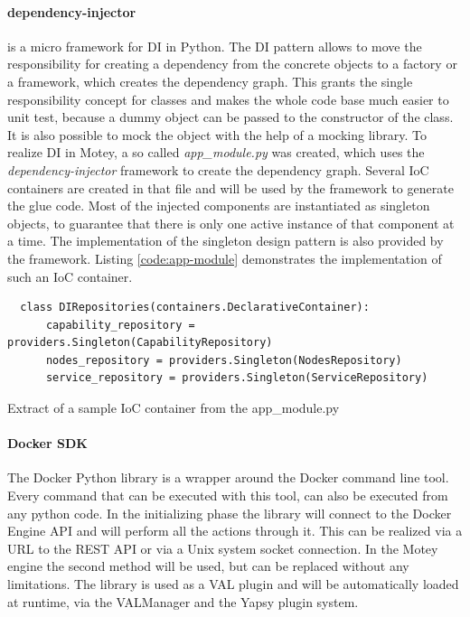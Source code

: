 \paragraph{dependency-injector} is a micro framework for \acf{DI} in Python.
The \ac{DI} pattern allows to move the responsibility for creating a dependency from the concrete objects to a factory or a framework, which creates the dependency graph.
This grants the single responsibility concept for classes and makes the whole code base much easier to unit test, because a dummy object can be passed to the constructor of the class.
It is also possible to mock the object with the help of a mocking library.
To realize \ac{DI} in Motey, a so called \textit{app\_module.py} was created, which uses the \textit{dependency-injector} framework to create the dependency graph.
Several \ac{IoC} containers are created in that file and will be used by the framework to generate the glue code.
Most of the injected components are instantiated as singleton objects, to guarantee that there is only one active instance of that component at a time.
The implementation of the singleton design pattern is also provided by the framework.
Listing \ref{code:app-module} demonstrates the implementation of such an \ac{IoC} container.
\begin{listing}[H]
  \begin{verbatim}
  class DIRepositories(containers.DeclarativeContainer):
      capability_repository = providers.Singleton(CapabilityRepository)
      nodes_repository = providers.Singleton(NodesRepository)
      service_repository = providers.Singleton(ServiceRepository)
  \end{verbatim}
  \caption{Extract of a sample IoC container from the app\_module.py}
  \label{code:app-module}
\end{listing}

\paragraph{Docker \ac{SDK}}
The Docker Python library is a wrapper around the Docker command line tool.
Every command that can be executed with this tool, can also be executed from any python code.
In the initializing phase the library will connect to the Docker Engine \ac{API} and will perform all the actions through it.
This can be realized via a \ac{URL} to the \ac{REST} \ac{API} or via a Unix system socket connection.
In the Motey engine the second method will be used, but can be replaced without any limitations.
The library is used as a \ac{VAL} plugin and will be automatically loaded at runtime, via the VALManager and the Yapsy plugin system.

